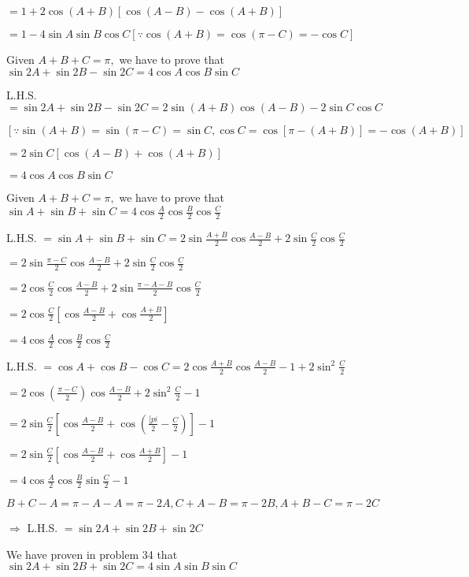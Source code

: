   $= 1 + 2\cos(A + B)[\cos(A - B) - \cos(A + B)]$

  $= 1 - 4\sin A\sin B\cos C[\because\cos(A + B) = \cos(\pi - C) = -\cos C]$

\item Given $A + B + C = \pi,$ we have to prove that $\sin 2A + \sin 2B - \sin 2C = 4\cos A\cos B\sin C$

  L.H.S. $= \sin 2A + \sin 2B - \sin 2C = 2\sin(A + B)\cos(A - B) - 2\sin C\cos C$

  $[\because \sin(A + B) = \sin(\pi - C) = \sin C, \cos C = \cos[\pi - (A + B)] = -\cos(A + B)]$

  $=2\sin C[\cos(A - B) + \cos(A + B)]$

  $= 4\cos A\cos B\sin C$

\item Given $A + B + C = \pi,$ we have to prove that $\sin A + \sin B + \sin C = 4\cos \frac{A}{2}\cos \frac{B}{2}\cos
  \frac{C}{2}$

  L.H.S. $= \sin A + \sin B + \sin C = 2\sin\frac{A + B}{2}\cos\frac{A - B}{2} + 2\sin\frac{C}{2}\cos\frac{C}{2}$

  $= 2\sin\frac{\pi - C}{2}\cos\frac{A - B}{2} + 2\sin\frac{C}{2}\cos\frac{C}{2}$

  $= 2\cos\frac{C}{2}\cos\frac{A - B}{2} + 2\sin\frac{\pi - A - B}{2}\cos\frac{C}{2}$

  $= 2\cos\frac{C}{2}[\cos\frac{A - B}{2} + \cos\frac{A + B}{2}]$

  $= 4\cos\frac{A}{2}\cos\frac{B}{2}\cos\frac{C}{2}$

\item L.H.S. $= \cos A + \cos B - \cos C = 2\cos\frac{A + B}{2}\cos\frac{A - B}{2} - 1 + 2\sin^2\frac{C}{2}$

  $= 2\cos\left(\frac{\pi - C}{2}\right)\cos\frac{A - B}{2} + 2\sin^2\frac{C}{2} - 1$

  $= 2\sin\frac{C}{2}\left[\cos\frac{A - B}{2} + \cos\left(\frac{[pi}{2} - \frac{C}{2}\right)\right] - 1$

  $= 2\sin\frac{C}{2}\left[\cos\frac{A - B}{2} + \cos\frac{A + B}{2}\right] - 1$

  $= 4\cos \frac{A}{2}\cos \frac{B}{2}\sin \frac{C}{2} - 1$

\item $B + C - A = \pi - A - A = \pi - 2A, C + A - B = \pi - 2B, A + B - C = \pi - 2C$

  $\Rightarrow$ L.H.S. $= \sin 2A + \sin 2B + \sin 2C$

  We have proven in problem 34 that $\sin 2A + \sin 2B + \sin 2C = 4\sin A\sin B\sin C$

